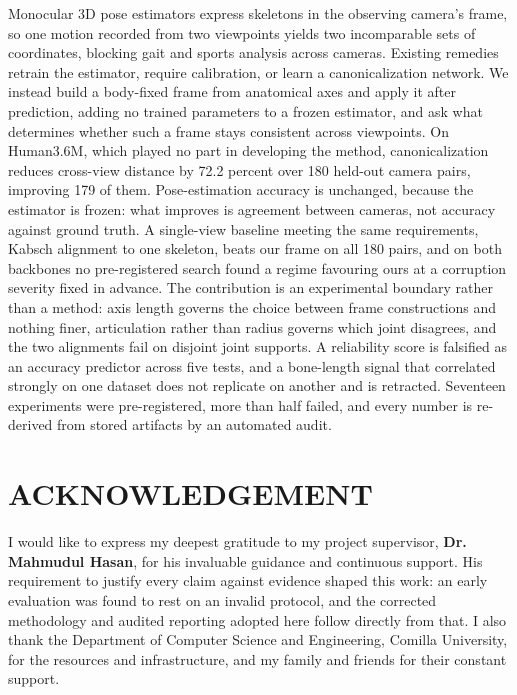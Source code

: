 \documentclass[12pt,a4paper]{report}
\begin{document}
\doublespacing
{\fontsize{12}{15}\selectfont
Monocular 3D pose estimators express skeletons in the observing camera's frame, so one motion recorded from two viewpoints yields two incomparable sets of coordinates, blocking gait and sports analysis across cameras. Existing remedies retrain the estimator, require calibration, or learn a canonicalization network. We instead build a body-fixed frame from anatomical axes and apply it after prediction, adding no trained parameters to a frozen estimator, and ask what determines whether such a frame stays consistent across viewpoints. On Human3.6M, which played no part in developing the method, canonicalization reduces cross-view distance by 72.2 percent over 180 held-out camera pairs, improving 179 of them. Pose-estimation accuracy is unchanged, because the estimator is frozen: what improves is agreement between cameras, not accuracy against ground truth. A single-view baseline meeting the same requirements, Kabsch alignment to one skeleton, beats our frame on all 180 pairs, and on both backbones no pre-registered search found a regime favouring ours at a corruption severity fixed in advance. The contribution is an experimental boundary rather than a method: axis length governs the choice between frame constructions and nothing finer, articulation rather than radius governs which joint disagrees, and the two alignments fail on disjoint joint supports. A reliability score is falsified as an accuracy predictor across five tests, and a bone-length signal that correlated strongly on one dataset does not replicate on another and is retracted. Seventeen experiments were pre-registered, more than half failed, and every number is re-derived from stored artifacts by an automated audit.
}

\chapter*{ACKNOWLEDGEMENT}
\justifying
{\fontsize{12pt}{15pt}\selectfont
I would like to express my deepest gratitude to my project supervisor, \textbf{Dr. Mahmudul Hasan}, for his invaluable guidance and continuous support. His requirement to justify every claim against evidence shaped this work: an early evaluation was found to rest on an invalid protocol, and the corrected methodology and audited reporting adopted here follow directly from that. I also thank the Department of Computer Science and Engineering, Comilla University, for the resources and infrastructure, and my family and friends for their constant support.
}
\end{document}
